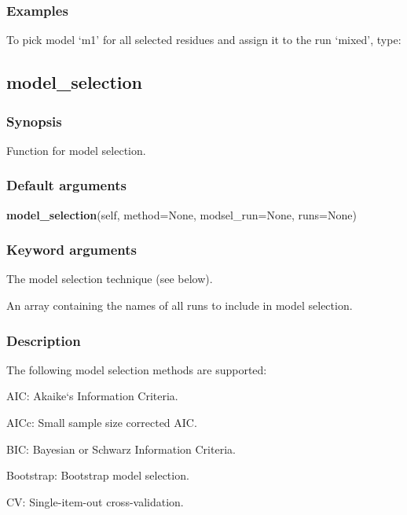 \subsubsection{Examples}

To pick model `m1' for all selected residues and assign it to the run `mixed', type:




\newpage

\subsection{model\_selection}


\subsubsection{Synopsis}

Function for model selection.

\subsubsection{Default arguments}

\textsf{\textbf{model\_selection}(self, method=None, modsel\_run=None, runs=None)}


\subsubsection{Keyword arguments}

  The model selection technique (see below).

  An array containing the names of all runs to include in model selection.

\subsubsection{Description}

The following model selection methods are supported:

AIC:  Akaike`s Information Criteria.

AICc:  Small sample size corrected AIC.

BIC:  Bayesian or Schwarz Information Criteria.

Bootstrap:  Bootstrap model selection.

CV:  Single-item-out cross-validation.


